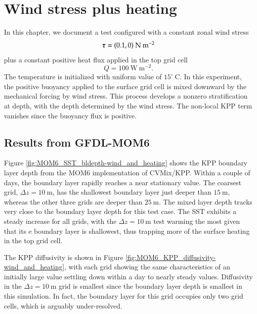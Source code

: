 \chapter{Wind stress plus heating}
\label{chapter:winds_and_heating}

In this chapter, we document a test configured with a constant zonal
wind stress
\begin{equation}
 \mbox{\boldmath $\tau$}  =  (0.1, 0)~\mbox{N}~\mbox{m}^{-2}
\end{equation}
plus a constant positive heat flux applied in the top grid cell
\begin{equation}
Q=100~\mbox{W}~\mbox{m}^{-2}.
\end{equation}
The temperature is initialized with uniform value of
$15^{\circ}~\mbox{C}$.  In this experiment, the positive buoyancy
applied to the surface grid cell is mixed downward by the mechanical
forcing by wind stress.  This process develops a nonzero
stratification at depth, with the depth determined by the wind stress.
The non-local KPP term vanishes since the buoyancy flux is positive.



\minitoc


\section{Results from GFDL-MOM6}
\label{section:wind_and_heating_mom6}

Figure \ref{fig:MOM6_SST_bldepth-wind_and_heating} shows the KPP
boundary layer depth from the MOM6 implementation of CVMix/KPP.
Within a couple of days, the boundary layer rapidly reaches a near
stationary value.  The coarsest grid, $\Delta z = 10~\mbox{m}$, has
the shallowest boundary layer just deeper than $15~\mbox{m}$, whereas
the other three grids are deeper than $25~\mbox{m}$.  The mixed layer
depth tracks very close to the boundary layer depth for this test
case.  The SST exhibits a steady increase for all grids, with the
$\Delta z = 10~\mbox{m}$ test warming the most given that its e
boundary layer is shallowest, thus trapping more of the surface
heating in the top grid cell.

The KPP diffusivity is shown in Figure
\ref{fig:MOM6_KPP_diffusivity-wind_and_heating}, with each grid
showing the same characteristics of an initially large value settling
down within a day to nearly steady values.  Diffusivity in the $\Delta
z = 10~\mbox{m}$ grid is smallest since the boundary layer depth is
smallest in this simulation.  In fact, the boundary layer for this
grid occupies only two grid cells, which is arguably under-resolved.
  
